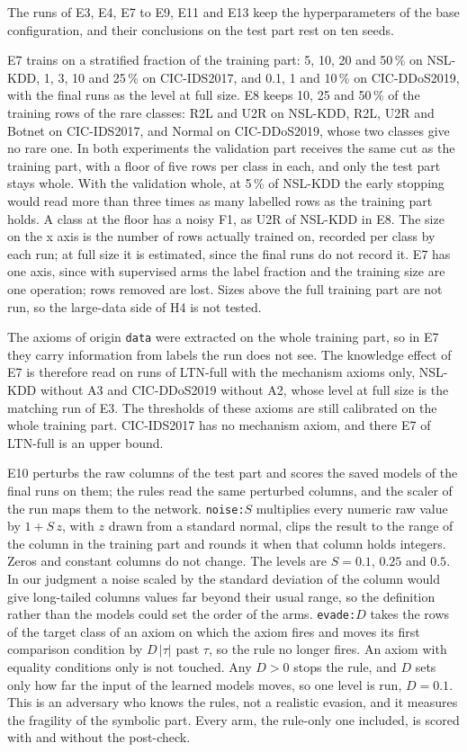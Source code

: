 The runs of E3, E4, E7 to E9, E11 and E13 keep the hyperparameters of the base configuration,
and their conclusions on the test part rest on ten seeds.

E7 trains on a stratified fraction of the training part: 5, 10, 20 and 50\,\% on NSL-KDD, 1, 3,
10 and 25\,\% on CIC-IDS2017, and 0.1, 1 and 10\,\% on CIC-DDoS2019, with the final runs as the
level at full size. E8 keeps 10, 25 and 50\,\% of the training rows of the rare classes: R2L and
U2R on NSL-KDD, R2L, U2R and Botnet on CIC-IDS2017, and Normal on CIC-DDoS2019, whose two classes
give no rare one. In both experiments the validation part receives the same cut as the training
part, with a floor of five rows per class in each, and only the test part stays whole. With the
validation whole, at 5\,\% of NSL-KDD the early stopping would read more than three times as many
labelled rows as the training part holds. A class at the floor has a noisy F1, as U2R of NSL-KDD
in E8. The size on the x axis is the number of rows actually trained on, recorded per class by
each run; at full size it is estimated, since the final runs do not record it. E7 has one axis,
since with supervised arms the label fraction and the training size are one operation; rows
removed are lost. Sizes above the full training part are not run, so the large-data side of H4 is
not tested.

The axioms of origin \texttt{data} were extracted on the whole training part, so in E7 they carry
information from labels the run does not see. The knowledge effect of E7 is therefore read on
runs of LTN-full with the mechanism axioms only, NSL-KDD without A3 and CIC-DDoS2019 without A2,
whose level at full size is the matching run of E3. The thresholds of these axioms are still
calibrated on the whole training part. CIC-IDS2017 has no mechanism axiom, and there E7 of
LTN-full is an upper bound.

E10 perturbs the raw columns of the test part and scores the saved models of the final runs on
them; the rules read the same perturbed columns, and the scaler of the run maps them to the
network. \texttt{noise:}$S$ multiplies every numeric raw value by $1 + S\,z$, with $z$ drawn from a
standard normal, clips the result to the range of the column in the training part and rounds it
when that column holds integers. Zeros and constant columns do not change. The levels are
$S = 0.1$, $0.25$ and $0.5$. In our judgment a noise scaled by the standard deviation of the column
would give long-tailed columns values far beyond their usual range, so the definition rather than the
models could set the order of the arms. \texttt{evade:}$D$ takes the rows of the target class of an axiom on which the axiom fires
and moves its first comparison condition by $D\,|\tau|$ past $\tau$, so the rule no longer fires.
An axiom with equality conditions only is not touched. Any $D>0$ stops the rule, and $D$ sets only
how far the input of the learned models moves, so one level is run, $D = 0.1$. This is an adversary
who knows the rules, not a realistic evasion, and it measures the fragility of the symbolic part.
Every arm, the rule-only one included, is scored with and without the post-check.

